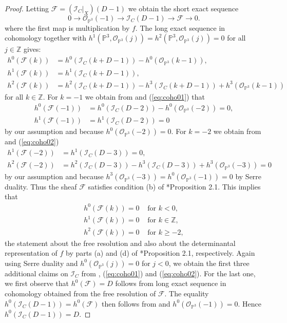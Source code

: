 \documentclass[a4paper,10pt]{amsart}
\theoremstyle{definition}
\theoremstyle{plain}
\newcommand{\cF}{{\mathcal F}}
\newcommand{\cI}{{\mathcal I}}
\newcommand{\cO}{{\mathcal O}}
\newcommand{\pp}{\mathbb{P}}
\newcommand{\Z}{{\mathbb Z}}
\begin{document}
\begin{proof}
    Letting $\cF=(\cI_C|_X)(D-1)$ we obtain the short exact sequence
    \begin{equation*}
        0\to\cO_{\pp^3}(-1)\to\cI_C(D-1)\to\cF\to0.
    \end{equation*}
where the first map is multiplication by $f$. The long exact sequence in cohomology together with $h^1(\pp^3,\cO_{\pp^3}(j))=h^2(\pp^3,\cO_{\pp^3}(j))=0$ for all $j\in\Z$ gives:
\begin{align}
        h^0(\cF(k))&=h^0(\cI_C(k+D-1))-h^0(\cO_{\pp^3}(k-1)),\label{eq:coho0}\\
        h^1(\cF(k))&=h^1(\cI_C(k+D-1)),\label{eq:coho01}\\
        h^2(\cF(k))&=h^2(\cI_C(k+D-1))-h^3(\cI_C(k+D-1))+h^3(\cO_{\pp^3}(k-1))\label{eq:coho02}
    \end{align}
    for all $k\in\Z$. For $k=-1$ we obtain from  and (\ref{eq:coho01}) that
    \begin{align*}
        h^0(\cF(-1))&=h^0(\cI_C(D-2))-h^0(\cO_{\pp^3}(-2))=0,\\
        h^1(\cF(-1))&=h^1(\cI_C(D-2))=0
    \end{align*}
    by our assumption and because $h^0(\cO_{\pp^3}(-2))=0$. For $k=-2$ we obtain from  and (\ref{eq:coho02})
    \begin{align*}
        h^1(\cF(-2))&=h^1(\cI_C(D-3))=0,\\
        h^2(\cF(-2))&=h^2(\cI_C(D-3))-h^3(\cI_C(D-3))+h^3(\cO_{\pp^3}(-3))=0
    \end{align*}
    by our assumption and because $h^3(\cO_{\pp^3}(-3))=h^0(\cO_{\pp^3}(-1))=0$ by Serre duality. Thus the sheaf $\cF$ satisfies condition (b) of \cite{EisenbudSchreyerWeyman2003UlrichBundles}*{Proposition 2.1}. This implies that
    \begin{align*}
        h^0(\cF(k))=0&\textrm{ for }k<0,\\
        h^1(\cF(k))=0&\textrm{ for }k\in\Z,\\
        h^2(\cF(k))=0&\textrm{ for }k\geq-2,
    \end{align*}
    the statement about the free resolution and also about the determinantal representation of $f$ by parts (a) and (d) of \cite{EisenbudSchreyerWeyman2003UlrichBundles}*{Proposition 2.1}, respectively.
    Again using Serre duality and $h^0(\cO_{\pp^3}(j))=0$ for $j<0$, we obtain the first three additional claims on  $\cI_C$ from , (\ref{eq:coho01}) and (\ref{eq:coho02}). For the last one, we first observe that $h^0(\cF)=D$ follows from long exact sequence in cohomology obtained from the free resolution of $\cF$. The equality $h^0(\cI_C(D-1))=h^0(\cF)$ then follows from  and $h^0(\cO_{\pp^3}(-1))=0$. Hence $h^0(\cI_C(D-1))=D$.
\end{proof}
\end{document}
